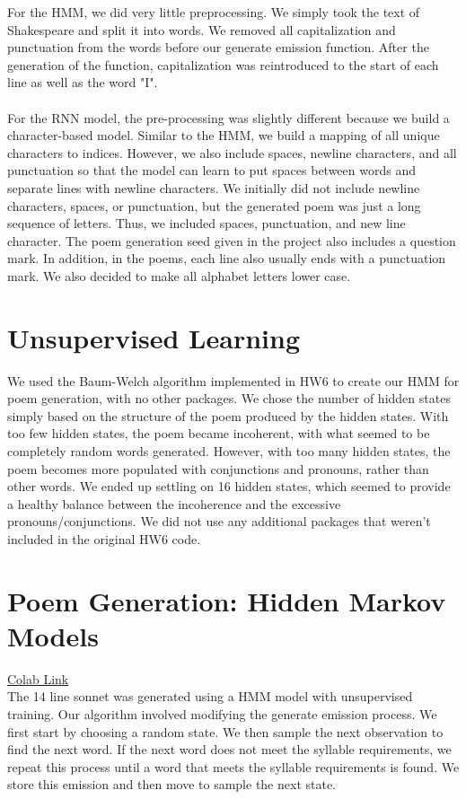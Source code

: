 \documentclass{article}
\begin{document}
For the HMM, we did very little preprocessing. We simply took the text of Shakespeare and split it into words. We removed all capitalization and punctuation from the words before our generate emission function. After the generation of the function, capitalization was reintroduced to the start of each line as well as the word "I".\\
\\
For the RNN model, the pre-processing was slightly different because we build a character-based model. Similar to the HMM, we build a mapping of all unique characters to indices. However, we also include spaces, newline characters, and all punctuation so that the model can learn to put spaces between words and separate lines with newline characters. We initially did not include newline characters, spaces, or punctuation, but the generated poem was just a long sequence of letters. Thus, we included spaces, punctuation, and new line character. The poem generation seed given in the project also includes a question mark. In addition, in the poems, each line also usually ends with a punctuation mark. We also decided to make all alphabet letters lower case. 

\section{Unsupervised Learning}
We used the Baum-Welch algorithm implemented in HW6 to create our HMM for poem generation, with no other packages. We chose the number of hidden states simply based on the structure of the poem produced by the hidden states. With too few hidden states, the poem became incoherent, with what seemed to be completely random words generated. However, with too many hidden states, the poem becomes more populated with conjunctions and pronouns, rather than other words. We ended up settling on 16 hidden states, which seemed to provide a healthy balance between the incoherence and the excessive pronouns/conjunctions. We did not use any additional packages that weren't included in the original HW6 code.
\newpage
\section{Poem Generation: Hidden Markov Models}

\href{https://colab.research.google.com/drive/1l25ou9yO_X3g2_WjsuIXAGUL_YcAR7yZ?usp=sharing}{Colab Link}\\

The 14 line sonnet was generated using a HMM model with unsupervised training. Our algorithm involved modifying the generate emission process. We first start by choosing a random state. We then sample the next observation to find the next word. If the next word does not meet the syllable requirements, we repeat this process until a word that meets the syllable requirements is found. We store this emission and then move to sample the next state. 
\newline
\end{document}
